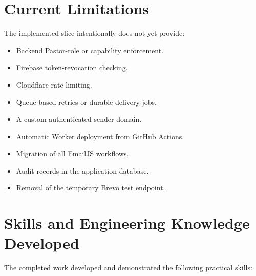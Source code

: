 \documentclass[11pt,a4paper,oneside]{report}
\begin{document}
\section{Current Limitations}

The implemented slice intentionally does not yet provide:

\begin{itemize}
  \item Backend Pastor-role or capability enforcement.
  \item Firebase token-revocation checking.
  \item Cloudflare rate limiting.
  \item Queue-based retries or durable delivery jobs.
  \item A custom authenticated sender domain.
  \item Automatic Worker deployment from GitHub Actions.
  \item Migration of all EmailJS workflows.
  \item Audit records in the application database.
  \item Removal of the temporary Brevo test endpoint.
\end{itemize}

\section{Skills and Engineering Knowledge Developed}

The completed work developed and demonstrated the following practical skills:
\end{document}
